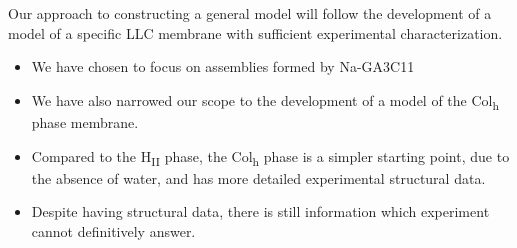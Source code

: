 \documentclass{article}
\begin{document}
  Our approach to constructing a general model will follow the development of a
  model of a specific LLC membrane with sufficient experimental characterization.
    \begin{itemize}
	    \item We have chosen to focus on assemblies formed by Na-GA3C11
	    \item We have also narrowed our scope to the development of 
	    a model of the Col\textsubscript{h} phase membrane.
	    \item Compared to the H\textsubscript{II} phase, the Col\textsubscript{h}
	    phase is a simpler starting point, due to the absence of water, and has
	    more detailed experimental structural data.  %
	    \item Despite having structural data, there is still information which 
	    experiment cannot definitively answer.
    \end{itemize}



\end{document}
